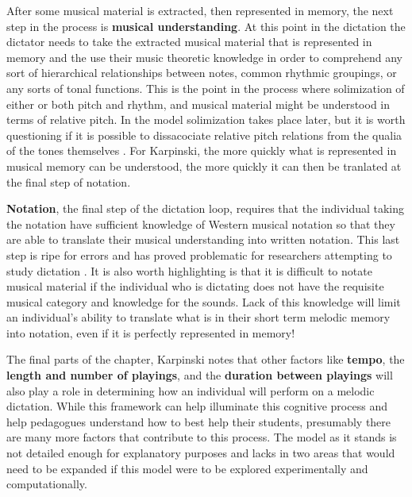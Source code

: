 \documentclass[]{book}
\begin{document}
After some musical material is extracted, then represented in memory, the next step in the process is \textbf{musical understanding}.
At this point in the dictation the dictator needs to take the extracted musical material that is represented in memory and the use their music theoretic knowledge in order to comprehend any sort of hierarchical relationships between notes, common rhythmic groupings, or any sorts of tonal functions.
This is the point in the process where solimization of either or both pitch and rhythm, and musical material might be understood in terms of relative pitch.
In the model solimization takes place later, but it is worth questioning if it is possible to dissacociate relative pitch relations from the qualia of the tones themselves \citep{arthurPerceptualStudyScaledegree2018}.
For Karpinski, the more quickly what is represented in musical memory can be understood, the more quickly it can then be tranlated at the final step of notation.

\textbf{Notation}, the final step of the dictation loop, requires that the individual taking the notation have sufficient knowledge of Western musical notation so that they are able to translate their musical understanding into written notation.
This last step is ripe for errors and has proved problematic for researchers attempting to study dictation \citep{taylorStrategiesMemoryShort1983, klonoskiImprovingDictationAuralSkills2006}.
It is also worth highlighting is that it is difficult to notate musical material if the individual who is dictating does not have the requisite musical category and knowledge for the sounds.
Lack of this knowledge will limit an individual's ability to translate what is in their short term melodic memory into notation, even if it is perfectly represented in memory!

The final parts of the chapter, Karpinski notes that other factors like \textbf{tempo}, the \textbf{length and number of playings}, and the \textbf{duration between playings} will also play a role in determining how an individual will perform on a melodic dictation.
While this framework can help illuminate this cognitive process and help pedagogues understand how to best help their students, presumably there are many more factors that contribute to this process.
The model as it stands is not detailed enough for explanatory purposes and lacks in two areas that would need to be expanded if this model were to be explored experimentally and computationally.
\end{document}
